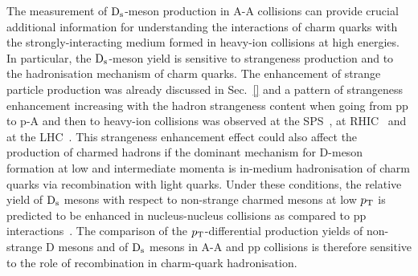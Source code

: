 The measurement of ${\rm D_s}$-meson production in A-A collisions can provide 
crucial additional information for understanding the 
interactions of charm quarks with the strongly-interacting 
medium formed in heavy-ion collisions at high energies.
In particular, the ${\rm D_s}$-meson yield is sensitive to strangeness production 
and to the hadronisation mechanism of charm quarks.
The enhancement of strange particle production was already discussed in
Sec.~\ref{} and a pattern of strangeness enhancement increasing with the hadron strangeness 
content when going from pp to p-A and then to heavy-ion collisions was observed at 
the SPS~\cite{NA57_158,NA57_40,NA49_Kpi,NA49_LambdaXi}, at
RHIC~\cite{STAR_hyperons} and at the LHC~\cite{ALICE:2017jyt}.
This strangeness enhancement effect could also affect the production of 
charmed hadrons if the dominant mechanism for D-meson formation at 
low and intermediate momenta is in-medium hadronisation of charm quarks via 
recombination with light quarks.
Under these conditions, the relative yield 
of ${\rm D_s}$ mesons with respect to non-strange charmed mesons at low $p_{\rm T}$ is predicted to be enhanced
in nucleus-nucleus collisions as compared to pp 
interactions~\cite{Andronic2003,RafelskiKuznetsova,HeFriesRapp}.
The comparison of the $p_{\rm T}$-differential production yields 
of non-strange D mesons and of ${\rm D_s}$ mesons in A-A and pp 
collisions is therefore sensitive to the role of recombination in charm-quark 
hadronisation.

